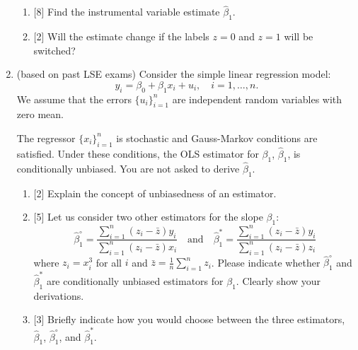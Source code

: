 \documentclass[12pt]{article}
\newcommand{\hb}{\hat{\beta}}
\begin{document}
\begin{enumerate}

    \begin{enumerate}
        \item {[8]} Find the instrumental variable estimate $\hb_1$.
        \item {[2]} Will the estimate change if the labels $z = 0$ and $z = 1$ will be switched?
    \end{enumerate}
    

    \item (based on past LSE exams) Consider the simple linear regression model:
    \[
    y_i = \beta_0 + \beta_1 x_i + u_i, \quad i = 1, \dots, n.
    \]
    We assume that the errors $\{u_i\}_{i=1}^n$ are independent random variables with zero mean. 
    
    The regressor $\{x_i\}_{i=1}^n$ is stochastic and Gauss-Markov conditions are satisfied.
    Under these conditions, the OLS estimator for $\beta_1$, $\hb_1$, is conditionally unbiased. 
    You are not asked to derive $\hb_1$.
    
    \begin{enumerate}
        \item {[2]} Explain the concept of unbiasedness of an estimator. 
    
        \item {[5]} Let us consider two other estimators for the slope \(\beta_1\):
        \[
        \hat{\beta}_1^\circ = \frac{\sum_{i=1}^n (z_i - \bar{z}) y_i}{\sum_{i=1}^n (z_i - \bar{z}) x_i} \quad \text{and} \quad
        \hat{\beta}_1^* = \frac{\sum_{i=1}^n (z_i - \bar{z}) y_i}{\sum_{i=1}^n (z_i - \bar{z}) z_i}
        \]
        where \(z_i = x_i^3\) for all \(i\) and \(\bar{z} = \frac{1}{n} \sum_{i=1}^n z_i\). 
        Please indicate whether \(\hat{\beta}_1^\circ\) and \(\hat{\beta}_1^*\) are conditionally unbiased estimators for \(\beta_1\). 
        Clearly show your derivations. 
    
        \item {[3]} Briefly indicate how you would choose between the three estimators, \(\hat{\beta}_1\), \(\hat{\beta}_1^\circ\), and \(\hat{\beta}_1^*\). 
    \end{enumerate}

\end{enumerate}
\end{document}
